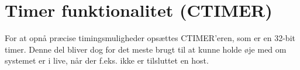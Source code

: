 \section{Timer funktionalitet (CTIMER)}
For at opnå præcise timingsmuligheder opsættes CTIMER'eren, som er en 32-bit timer. Denne del bliver dog for det meste brugt til at kunne holde øje med om systemet er i live, når der f.eks. ikke er tilsluttet en host. 